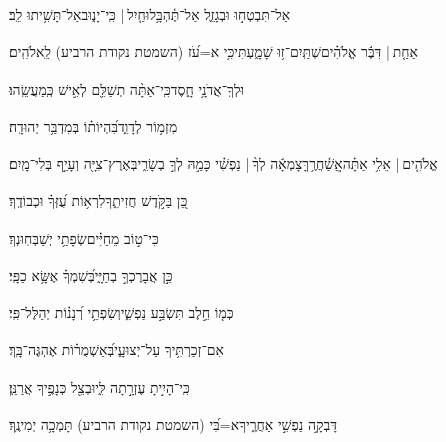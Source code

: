 \documentclass[12pt]{article}
\newcommand{\loc}[1]{\textsuperscript{\locf{#1}}}
\begin{document}
{\loc{ יא}~}‏אַל־תִּבְטְח֣וּ {\hfill}וּבְגָזֵ֢ל אַל־תֶּ֫הְבָּ֥לוּ\newline\hspace*{.5em}חַ֤יִל |  כִּֽי־יָנ֑וּב{\hfill}אַל־תָּשִׁ֥יתוּ לֵֽב׃\par

{\loc{ יב}~}‏אַחַ֤ת | {\hfill}דִּבֶּ֬ר אֱלֹהִ֗ים\newline\hspace*{.5em}שְׁתַּֽיִם־ז֥וּ שָׁמָ֑עְתִּי{\hfill}כִּ֥י א=עֹ֝ז (השמטת נקודת הרביע) לֵֽאלֹהִֽים׃\par

{\loc{ יג}~}‏וּלְךָֽ־אֲדֹנָ֥י חָ֑סֶד{\hfill}כִּֽי־אַתָּ֨ה תְשַׁלֵּ֖ם לְאִ֣ישׁ כְּֽמַעֲשֵֽׂהוּ׃\par\pend
\ledpb
\pstart[\subsection*{\textcolor{red}{פרק סג}}]\label{פרק סג}
{\loc{ א}~}‏מִזְמ֥וֹר לְדָוִ֑ד{\hfill}בִּ֝הְיוֹת֗וֹ בְּמִדְבַּ֥ר יְהוּדָֽה׃\par

{\loc{ ב}~}‏אֱלֹהִ֤ים |  אֵלִ֥י אַתָּ֗ה{\hfill}אֲֽשַׁ֫חֲרֶ֥ךָּ\newline\hspace*{.5em}צָמְאָ֬ה לְךָ֨ |  נַפְשִׁ֗י כָּמַ֣הּ לְךָ֣ בְשָׂרִ֑י{\hfill}בְּאֶרֶץ־צִיָּ֖ה וְעָיֵ֣ף בְּלִי־מָֽיִם׃\par

{\loc{ ג}~}‏כֵּ֭ן בַּקֹּ֣דֶשׁ חֲזִיתִ֑ךָ{\hfill}לִרְא֥וֹת עֻ֝זְּךָ֗ וּכְבוֹדֶֽךָ׃\par

{\loc{ ד}~}‏כִּי־ט֣וֹב  מֵחַיִּ֗ים{\hfill}שְׂפָתַ֥י יְשַׁבְּחֽוּנְךָ׃\par

{\loc{ ה}~}‏כֵּ֣ן אֲבָרֶכְךָ֣ בְחַיָּ֑י{\hfill}בְּ֝שִׁמְךָ֗ אֶשָּׂ֥א כַפָּֽי׃\par

{\loc{ ו}~}‏כְּמ֤וֹ חֵ֣לֶב  תִּשְׂבַּ֣ע נַפְשִׁ֑י{\hfill}וְשִׂפְתֵ֥י רְ֝נָנ֗וֹת יְהַלֶּל־פִּֽי׃\par

{\loc{ ז}~}‏אִם־זְכַרְתִּ֥יךָ עַל־יְצוּעָ֑י{\hfill}בְּ֝אַשְׁמֻר֗וֹת אֶהְגֶּה־בָּֽךְ׃\par

{\loc{ ח}~}‏כִּֽי־הָיִ֣יתָ עֶזְרָ֣תָה לִּ֑י{\hfill}וּבְצֵ֖ל כְּנָפֶ֣יךָ אֲרַנֵּֽן׃\par

{\loc{ ט}~}‏דָּבְקָ֣ה נַפְשִׁ֣י אַחֲרֶ֑יךָ{\hfill}א=בִּ֝י (השמטת נקודת הרביע) תָּמְכָ֥ה יְמִינֶֽךָ׃\par
\end{document}
